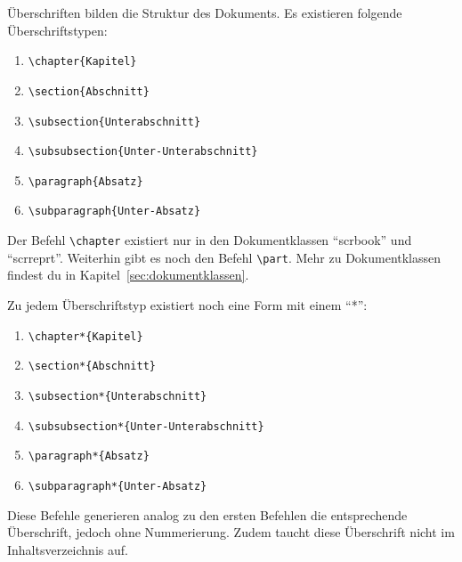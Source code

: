 Überschriften bilden die Struktur des Dokuments. Es existieren folgende Überschriftstypen:

\begin{enumerate}
	\item \texttt{\textbackslash chapter\{Kapitel\}}
	\item \texttt{\textbackslash section\{Abschnitt\}}
	\item \texttt{\textbackslash subsection\{Unterabschnitt\}}
	\item \texttt{\textbackslash subsubsection\{Unter-Unterabschnitt\}}
	\item \texttt{\textbackslash paragraph\{Absatz\}}
	\item \texttt{\textbackslash subparagraph\{Unter-Absatz\}}
\end{enumerate}

Der Befehl \texttt{\textbackslash chapter} existiert nur in den Dokumentklassen \enquote{scrbook} und \enquote{scrreprt}. Weiterhin gibt es noch den Befehl \texttt{\textbackslash part}. Mehr zu Dokumentklassen findest du in Kapitel~\ref{sec:dokumentklassen}.

Zu jedem Überschriftstyp existiert noch eine Form mit einem \enquote{*}:

\begin{enumerate}
	\item \texttt{\textbackslash chapter*\{Kapitel\}}
	\item \texttt{\textbackslash section*\{Abschnitt\}}
	\item \texttt{\textbackslash subsection*\{Unterabschnitt\}}
	\item \texttt{\textbackslash subsubsection*\{Unter-Unterabschnitt\}}
	\item \texttt{\textbackslash paragraph*\{Absatz\}}
	\item \texttt{\textbackslash subparagraph*\{Unter-Absatz\}}
\end{enumerate}

Diese Befehle generieren analog zu den ersten Befehlen die entsprechende Überschrift, jedoch ohne Nummerierung. Zudem taucht diese Überschrift nicht im Inhaltsverzeichnis auf.




